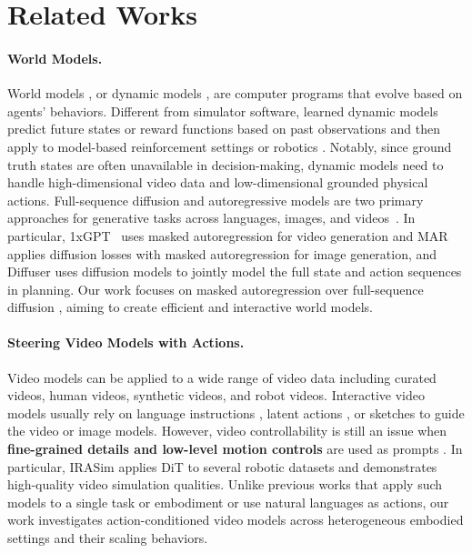 \section{Related Works}
\label{sec:related_works}

\paragraph{World Models.}
 World models \cite{ha2018world}, or dynamic models \cite{bertsekas1995neuro}, are computer programs that evolve based on agents' behaviors. Different from simulator software, learned dynamic models predict future states or reward functions based on past observations and then apply to model-based reinforcement settings \cite{zhang2021autoregressive,chen2021decision,hansen2023td} or robotics \cite{byravan2017se3,li2018learning,seo2023masked}. Notably, since ground truth states are often unavailable in decision-making, dynamic models need to handle high-dimensional video data and low-dimensional grounded physical actions. Full-sequence diffusion and autoregressive models are two primary approaches for generative tasks across languages, images, and videos~\cite{li2024autoregressive,ye2024latent,kondratyuk2023videopoet,chang2022maskgit,ho2022video}. In particular, 1xGPT~\cite{1X_Technologies_1X_World_Model_2024} uses masked autoregression for video generation and MAR~\cite{li2024autoregressive} applies diffusion losses with masked autoregression for image generation, and Diffuser \cite{janner2022planning} uses diffusion models to jointly model the full state and action sequences in planning. Our work focuses on masked autoregression over full-sequence diffusion \cite{bruce2024genie,valevski2024diffusionmodelsrealtimegame,alonso2024diffusion}, aiming to create efficient and interactive world models.
 
\paragraph{Steering Video Models with Actions.}
Video models \cite{videoworldsimulators2024} can be applied to a wide range of video data including curated videos, human videos, synthetic videos, and robot videos. Interactive video models usually rely on language instructions \cite{yang2023learning}, latent actions \cite{bruce2024genie}, or sketches to guide the video or image models.  However, video controllability is still an issue when \textbf{fine-grained details and low-level motion controls} are  used as prompts \cite{zhu2024irasim,rigter2024avid,alonso2024diffusion}. In particular, IRASim \cite{zhu2024irasim} applies DiT \cite{peebles2023scalable} to several robotic datasets and demonstrates high-quality video simulation qualities. Unlike previous works that apply such models to a single task or embodiment or use natural languages as actions, our work investigates action-conditioned video models across heterogeneous embodied settings and their scaling behaviors.  

